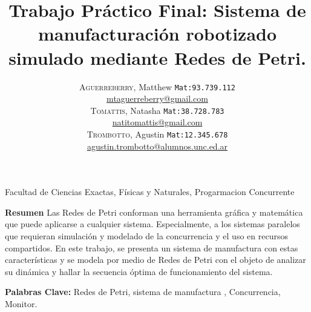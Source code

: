 \documentclass[10pt, a4paper,notitlepage]{article}
\newcommand{\HRule}{\rule{\linewidth}{0.5mm}} %
\begin{document}
{\center \large \textsf{Facultad de Ciencias Exactas, Físicas y Naturales, Progarmacion Concurrente\\}}
\title{%
		{ \bfseries{Trabajo Práctico Final: Sistema de manufacturación robotizado simulado mediante Redes de Petri.}}\\[0.4cm]
		} %
\author{
	\textsc{Aguerreberry}, Matthew  {\small \texttt{Mat:93.739.112}}\\
	\href{mailto:mtaguerreberry@gmail.com}{mtaguerreberry@gmail.com}\\
	\textsc{Tomattis}, Natasha  {\small \texttt{Mat:38.728.783}}\\
	\href{mailto:natitomattis@gmail.com}{natitomattis@gmail.com}\\
	\textsc{Trombotto}, Agustin  {\small \texttt{Mat:12.345.678}}\\
	\href{mailto:agustin.trombotto@alumnos.unc.ed.ar}{agustin.trombotto@alumnos.unc.ed.ar}\\
}

{\let\newpage\relax\maketitle}

\begin{par}  
\textbf{Resumen} Las Redes de Petri conforman una herramienta gráfica y matemática que puede aplicarse a cualquier sistema. Especialmente, a los sistemas paralelos que requieran simulación y modelado de la concurrencia y el uso en recursos compartidos. En este trabajo, se presenta un sistema de manufactura con estas características y se modela por medio de Redes de Petri con el objeto de analizar su dinámica y hallar la secuencia óptima de funcionamiento del sistema.
\\  
\end{par}

\textbf{Palabras Clave:} Redes de Petri, sistema de manufactura , Concurrencia, Monitor.\\
\end{document}
